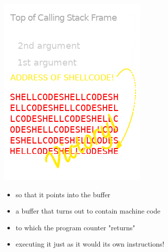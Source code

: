 \documentclass[11pt]{article}
\begin{document}
\begin{center}
\includegraphics[width=.9\linewidth]{./img/stack_frame_attack.png}
\end{center}
\begin{itemize}
\item so that it points into the buffer
\item a buffer that turns out to contain machine code
\item to which the program counter "returns"
\item executing it just as it would its own instructions!
\end{itemize}
\end{document}
